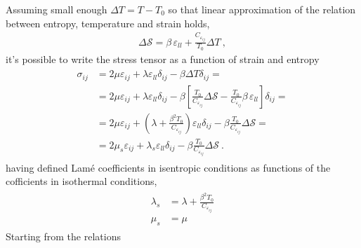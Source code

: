 \documentclass[letterpaper,10pt,english]{jupyterBook}
\begin{document}
\sphinxAtStartPar
Assuming small enough \(\Delta T = T - T_0\) so that linear approximation of the relation between entropy, temperature and strain holds,
\begin{equation*}
\begin{split}\Delta \mathcal{S} = \beta \, \varepsilon_{ll} + \frac{C_{\varepsilon_{ij}}}{T_0} \Delta T \ ,\end{split}
\end{equation*}
\sphinxAtStartPar
it’s possible to write the stress tensor as a function of strain and entropy
\begin{equation*}
\begin{split}\begin{aligned}
  \sigma_{ij} 
  & = 2 \mu \varepsilon_{ij} + \lambda \varepsilon_{ll} \delta_{ij} - \beta \Delta T \delta_{ij} = \\
  & = 2 \mu \varepsilon_{ij} + \lambda \varepsilon_{ll} \delta_{ij} - \beta \left[ \frac{T_0}{C_{\varepsilon_{ij}}} \Delta \mathcal{S} - \frac{T_0}{C_{\varepsilon_{ij}}} \beta \, \varepsilon_{ll}  \right] \delta_{ij} = \\
  & = 2 \mu \varepsilon_{ij} + \left( \lambda + \frac{\beta^2 T_0}{C_{\varepsilon_{ij}}} \right) \varepsilon_{ll} \delta_{ij} - \beta \frac{T_0}{C_{\varepsilon_{ij}}} \Delta \mathcal{S} = \\
  & = 2 \mu_s \varepsilon_{ij} + \lambda_s \varepsilon_{ll} \delta_{ij} - \beta \frac{T_0}{C_{\varepsilon_{ij}}} \Delta \mathcal{S} \ .
\end{aligned}\end{split}
\end{equation*}
\sphinxAtStartPar
having defined Lamé coefficients in isentropic conditions as functions of the cofficients in isothermal conditions,
\begin{equation*}
\begin{split}\begin{aligned}
  \lambda_s & = \lambda + \frac{\beta^2 T_0}{C_{\varepsilon_{ij}}} \\
      \mu_s & = \mu
\end{aligned}\end{split}
\end{equation*}
\sphinxAtStartPar
{} Starting from the relations
\end{document}
